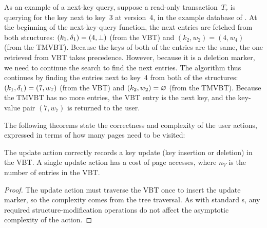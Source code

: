As an example of a next-key query, suppose a read-only transaction~$T_r$ is
querying for the key next to key~\num{3} at version~\num{4}, in the example
database of .
At the beginning of the next-key-query function, the next entries
are fetched from both structures: $(k_1, \delta_1) = (4, \bot)$
(from the VBT) and $(k_2, w_2) = (4, w_4)$ (from the TMVBT)\@.
Because the keys of both of the entries are the same, the one retrieved from
VBT takes precedence.
However, because it is a deletion marker, we need to continue the
search to find the next entries.
The algorithm thus continues by finding the entries next to key~\num{4} from
both of the structures: $(k_1, \delta_1) = (7, w_7)$ (from the VBT) and
$(k_2, w_2) = \varnothing$ (from the TMVBT)\@.
Because the TMVBT has no more entries, the VBT entry is the next key, and the
key-value pair $(7, w_7)$ is returned to the user.

The following theorems state the correctness and complexity of the user
actions, expressed in terms of how many pages need to be visited:

\thmskip
\begin{theorem}
\label{theorem:cmvbt:update} 
The update action correctly records a key update (key insertion or
deletion) in the VBT\@. 
A single update action has a cost of  page accesses,
where $n_V$ is the number of entries in the VBT\@.
\end{theorem}
\begin{proof}
The update action must traverse the VBT once to insert the update marker, so
the complexity  comes from the tree traversal.
As with standard \Btree{}s, any required structure-modification
operations do not affect the asymptotic complexity of the action.
\end{proof}
\thmskip

